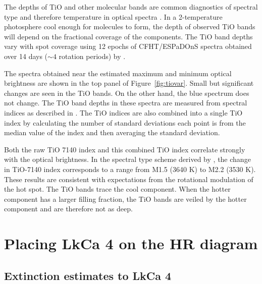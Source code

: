 \documentclass[twocolumn]{emulateapj}%
\begin{document}
The depths of TiO and other molecular bands are common diagnostics of spectral type and therefore temperature in optical spectra \citep[e.g.][]{kirkpatrick91}.  In a 2-temperature photosphere cool enough for molecules to form, the depth of observed TiO bands will depend on the fractional coverage of the components.  The TiO band depths vary with spot coverage using 12 epochs of CFHT/ESPaDOnS spectra obtained over 14 days ($\sim 4$ rotation periods) by \citet{donati14}.

The spectra obtained near the estimated maximum and minimum optical brightness are shown in the top panel of Figure~\ref{fig:tiovar}.  Small but significant changes are seen in the TiO bands.  On the other hand, the blue spectrum does not change.  The TiO band depths in these spectra are measured from spectral indices as described in \citet{herczeg14}.  The TiO indices are also combined into a single TiO index by calculating the number of standard deviations each point is from the median value of the index and then averaging the standard deviation.  

Both the raw TiO 7140 index and this combined TiO index correlate strongly with the optical brightness.  In the spectral type scheme derived by \citet{herczeg14}, the change in TiO-7140 index corresponds to a range from M1.5 (3640 K) to M2.2 (3530 K).  These results are consistent with expectations from the rotational modulation of the hot spot.  The TiO bands trace the cool component.  When the hotter component has a larger filling fraction, the TiO bands are veiled by the hotter component and are therefore not as deep.


\section{Placing LkCa 4 on the HR diagram}


\subsection{Extinction estimates to LkCa 4}
\end{document}
